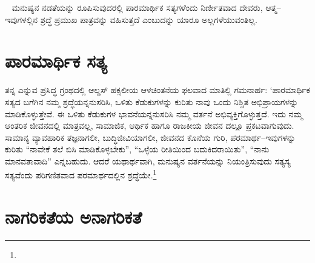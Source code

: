 {~\hfill{}} ಮನುಷ್ಯನ ನಡತೆಯನ್ನು ರೂಪಿಸುವುದರಲ್ಲಿ ಪಾರಮಾರ್ಥಿಕ ಸತ್ಯಗಳೆಂದು ನಿರ್ಣೀತವಾದ ದೇವರು, ಆತ್ಮ–ಇವುಗಳಲ್ಲಿನ ಶ್ರದ್ಧೆ ಪ್ರಮುಖ ಪಾತ್ರವನ್ನು ವಹಿಸುತ್ತದೆ ಎಂಬುದನ್ನು ಯಾರೂ ಅಲ್ಲಗಳೆಯುವಂತಿಲ್ಲ.


\section*{ಪಾರಮಾರ್ಥಿಕ ಸತ್ಯ}


ತನ್ನ  ಎನ್ನುವ ಪ್ರಸಿದ್ಧ ಗ್ರಂಥದಲ್ಲಿ ಆಲ್ಡಸ್ ಹಕ್ಸಲೀಯ ಆಳಚಿಂತನೆಯ ಫಲವಾದ ಮಾತಿಲ್ಲಿ ಗಮನಾರ್ಹ: ‘ಪಾರಮಾರ್ಥಿಕ ಸತ್ಯದ ಬಗೆಗಿನ ನಮ್ಮ ಶ್ರದ್ಧೆಯನ್ನನುಸರಿಸಿ, ಒಳಿತು ಕೆಡುಕುಗಳನ್ನು ಕುರಿತು ನಾವು ಒಂದು ನಿಶ್ಚಿತ ಅಭಿಪ್ರಾಯಗಳನ್ನು ಮಾಡಿಕೊಳ್ಳುತ್ತೇವೆ. ಈ ಒಳಿತು ಕೆಡುಕುಗಳ ಭಾವನೆಯನ್ನನುಸರಿಸಿ ನಮ್ಮ ವರ್ತನೆ ಅಭಿವ್ಯಕ್ತಿಗೊಳ್ಳುತ್ತದೆ. ಇದು ನಮ್ಮ ಆಂತರಿಕ ಜೀವನದಲ್ಲಿ ಮಾತ್ರವಲ್ಲ, ಸಾಮಾಜಿಕ, ಆರ್ಥಿಕ ಹಾಗೂ ರಾಜಕೀಯ ಜೀವನ ದಲ್ಲೂ ಪ್ರಕಟವಾಗುವುದು. ಸಾಮಾನ್ಯ ವ್ಯಾವಹಾರಿಕ ತಜ್ಞನಾಗಲೀ, ಬುದ್ಧಿಜೀವಿಯಾಗಲೀ, ಜೀವನದ ಕೊನೆಯ ಗುರಿ, ಪರಮಾರ್ಥ–ಇವುಗಳನ್ನು ಕುರಿತು “ನಾವೇಕೆ ತಲೆ ಬಿಸಿ ಮಾಡಿಕೊಳ್ಳಬೇಕು”, “ಒಳ್ಳೆಯ ರೀತಿಯಿಂದ ಬದುಕಿದರಾಯಿತು”, “ನಾನು ಮಾನವತಾವಾದಿ” ಎನ್ನಬಹುದು. ಆದರೆ ಯಥಾರ್ಥವಾಗಿ, ಮನುಷ್ಯನ ವರ್ತನೆಯನ್ನು ನಿಯಂತ್ರಿಸುವುದು ಸತ್ಯಸ್ಯ ಸತ್ಯವೆಂದು ಪರಿಗಣಿತವಾದ ಪರಮಾರ್ಥದಲ್ಲಿನ ಶ್ರದ್ಧೆಯೇ.\footnote{\hfill{}}


\section*{ನಾಗರಿಕತೆಯ ಅನಾಗರಿಕತೆ}


